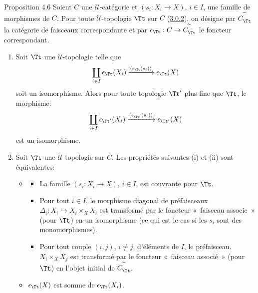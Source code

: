 \begin{enonce*}{Proposition 4.6}
Soient $C$ une $𝒰$-catégorie et $(s_i:X_i\rightarrow X)$,
$i\in I$, une famille de morphismes de $C$. Pour toute
$𝒰$-topologie $\Tt$ sur $C$ (\hyperref[II.def3.0.2]{3.0.2}), on désigne
par $C^{\widetilde{\phantom{,}}}_{\Tt}$ la catégorie de faisceaux
correspondante et par $\epsilon_{\Tt}:C\rightarrow
C^{\widetilde{\phantom{,}}}_{\Tt}$ le foncteur correspondant.
\begin{enumerate}
\renewcommand{\labelenumi}{\theenumi)}
\item Soit $\Tt$ une $𝒰$-topologie telle que
$$
\coprod_{i\in I}
\epsilon_{\Tt}(X_i)\xrightarrow{(\epsilon_{\Tt}(s_i))}\epsilon_{\Tt}(X)
$$
soit un isomorphisme. Alors pour toute topologie $\Tt'$ plus fine
que $\Tt$, le morphisme:
$$
\coprod_{i\in
  I}\epsilon_{\Tt'}(X_i)\xrightarrow{(\epsilon_{\Tt'}(s_i))}\epsilon_{\Tt'}(X)
$$
est un isomorphisme.

\item Soit $\Tt$ une $𝒰$-topologie sur $C$. Les
  propriétés suivantes {\rm(i)} et {\rm(ii)} sont équivalentes:
\begin{itemize}
\item[i)]
\begin{itemize}
\item[a)] La famille $(s_i:X_i\rightarrow X)$, $i\in I$, est couvrante
  pour $\Tt$.

\item[b)] Pour tout $i\in I$, le morphisme diagonal de préfaisceaux
  $\Delta_i:X_i\hookrightarrow X_i\times_X X_i$\pageoriginale
  est transformé par
  le foncteur « faisceau associe » (pour $\Tt$) en un
  isomorphisme (ce qui est le cas si les $s_i$ sont des
  monomorphismes).

\item[c)] Pour tout couple $(i,j)$, $i\neq j$, d'éléments de $I$, le
  préfaisceau. $X_i\times_X X_j$ est transformé par le foncteur
  « faisceau associé » (pour $\Tt$) en l'objet initial
  de $C^{\widetilde{\phantom{,}}}_{\Tt}$.
\end{itemize}
\item[ii)] $\epsilon_{\Tt}(X)$ est somme de $\epsilon_{\Tt}(X_i)$.
\end{itemize}
\end{enumerate}
\end{enonce*}

